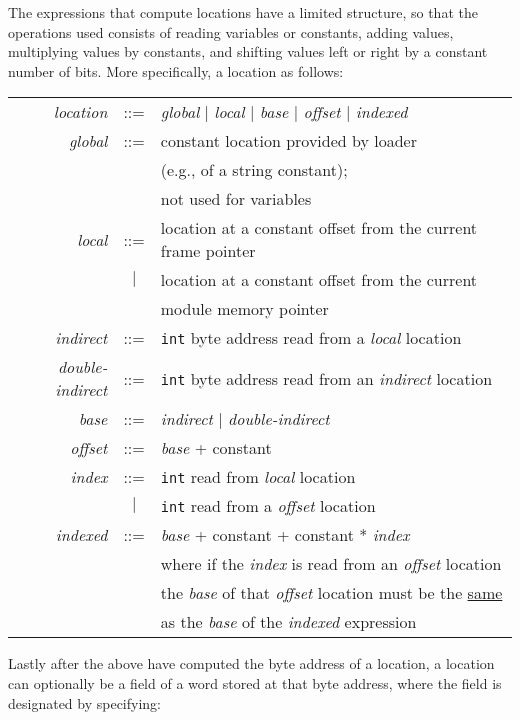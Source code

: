 \documentclass[12pt]{article}
\newenvironment{indpar}[1][0.3in]%
	{\begin{list}{}%
		     {\setlength{\itemsep}{0in}%
		      \setlength{\topsep}{0in}%
		      \setlength{\parsep}{1ex}%
		      \setlength{\labelwidth}{#1}%
		      \setlength{\leftmargin}{#1}%
		      \addtolength{\leftmargin}{\labelsep}}%
	 \item}%
	{\end{list}}
\begin{document}
The expressions that compute locations have a limited structure,
so that the operations used consists of reading variables or constants,
adding values, multiplying values by constants, and shifting values
left or right by a constant number of bits.  More specifically, a
location as follows:
\begin{indpar}\begin{tabular}{rcl}
{\em location} & ::= & {\em global} $|$ {\em local} $|$ {\em base}
                   $|$ {\em offset} $|$ {\em indexed}
\\[0.5ex]
{\em global} & ::= & constant location provided by loader \\
       &     & (e.g., of a string constant); \\
       &     & not used for variables
\\[0.5ex]
{\em local} & ::= & location at a constant offset from the
                  current frame pointer \\
          & $|$ & location at a constant offset from the
	          current \\
          &     & module memory pointer
\\[0.5ex]
{\em indirect} & ::= & {\tt int} byte address read from a {\em local} location
\\[0.5ex]
{\em double-indirect} & ::= &
    {\tt int} byte address read from an {\em indirect} location
\\[0.5ex]
{\em base} & ::= & {\em indirect} $|$ {\em double-indirect}
\\[0.5ex]
{\em offset} & ::= & {\em base} + constant
\\[0.5ex]
{\em index} & ::= & {\tt int} read from {\em local} location \\
      & $|$ & {\tt int} read from a {\em offset} location
\\[0.5ex]
{\em indexed} & ::= & {\em base} + constant + constant * {\em index} \\
        &     & where if the {\em index} is read from
	        an {\em offset} location \\
	&     & the {\em base} of that {\em offset} location
	        must be the \underline{same} \\
	&     & as the {\em base} of the {\em indexed} expression
\end{tabular}\end{indpar}

Lastly after the above have computed the byte address of a location,
a location can optionally be a field of a word stored at that
byte address, where the field is designated by specifying:
\end{document}
